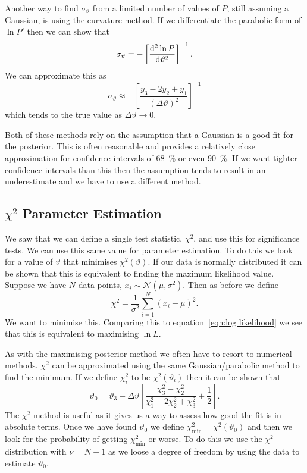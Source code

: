 \documentclass[a4paper]{article}
\newcommand{\distributed}{\sim}
\newcommand{\normal}{\mathcal{N}}
\begin{document}
    Another way to find \(\sigma_\vartheta\) from a limited number of values of \(P\), still assuming a Gaussian, is using the curvature method.
    If we differentiate the parabolic form of \(\ln P'\) then we can show that
    \[\sigma_\vartheta = -\left[\dv[2]{\ln P}{\vartheta}\right]^{-1}.\]
    We can approximate this as
    \[\sigma_\vartheta \approx -\left[\frac{y_3 - 2y_2 + y_1}{(\Delta\vartheta)^2}\right]^{-1}\]
    which tends to the true value as \(\Delta\vartheta \to 0\).
    
    Both of these methods rely on the assumption that a Gaussian is a good fit for the posterior.
    This is often reasonable and provides a relatively close approximation for confidence intervals of \SI{68}{\percent} or even \SI{90}{\percent}.
    If we want tighter confidence intervals than this then the assumption tends to result in an underestimate and we have to use a different method.
    
    \subsection{\texorpdfstring{\(\chi^2\)}{chisquared} Parameter Estimation}
    We saw that we can define a single test statistic, \(\chi^2\), and use this for significance tests.
    We can use this same value for parameter estimation.
    To do this we look for a value of \(\vartheta\) that minimises \(\chi^2(\vartheta)\).
    If our data is normally distributed it can be shown that this is equivalent to finding the maximum likelihood value.
    Suppose we have \(N\) data points, \(x_i \distributed \normal(\mu, \sigma^2)\).
    Then as before we define
    \[\chi^2 = \frac{1}{\sigma^2}\sum_{i=1}^{N} (x_i - \mu)^2.\]
    We want to minimise this.
    Comparing this to equation~\ref{eqn:log likelihood} we see that this is equivalent to maximising \(\ln L\).
    
    As with the maximising posterior method we often have to resort to numerical methods.
    \(\chi^2\) can be approximated using the same Gaussian/parabolic method to find the minimum.
    If we define \(\chi^2_i\) to be \(\chi^2(\vartheta_i)\) then it can be shown that
    \[\vartheta_0 = \vartheta_3 - \Delta\vartheta \left[\frac{\chi^2_3 - \chi^2_2}{\chi^2_1 - 2\chi^2_2 + \chi^2_3} + \frac{1}{2}\right].\]
    The \(\chi^2\) method is useful as it gives us a way to assess how good the fit is in absolute terms.
    Once we have found \(\vartheta_0\) we define \(\chi^2_{\min} = \chi^2(\vartheta_0)\) and then we look for the probability of getting \(\chi^2_{\min}\) or worse.
    To do this we use the \(\chi^2\) distribution with \(\nu = N - 1\) as we loose a degree of freedom by using the data to estimate \(\vartheta_0\).
    
\end{document}
